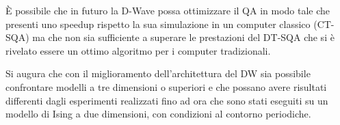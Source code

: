 È possibile che in futuro la D-Wave possa ottimizzare il QA in modo tale che presenti uno speedup rispetto la sua simulazione in un computer classico (CT-SQA) ma che non sia sufficiente a superare le prestazioni del DT-SQA che si è rivelato essere un ottimo algoritmo per i computer tradizionali.

Si augura che con il miglioramento dell'architettura del DW sia possibile confrontare modelli a tre dimensioni o superiori e che possano avere risultati differenti dagli esperimenti realizzati fino ad ora che sono stati eseguiti su un modello di Ising a due dimensioni, con condizioni al contorno periodiche.
